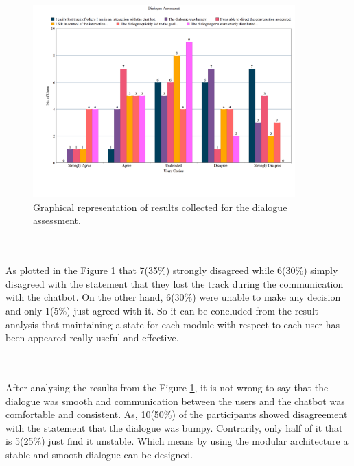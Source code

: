 \begin{figure}[!h]
    \centering
    \includegraphics[width=0.9\textwidth]{img/Dialogue_Assessment_Updated.png}
    \caption{Graphical representation of results collected for the dialogue assessment.}
    \label{fig:dialogAssess}
\end{figure}
\\~\\
As plotted in the Figure \ref{fig:dialogAssess} that 7(35\%) strongly disagreed while 6(30\%) simply disagreed with the statement that they lost the track during the communication with the chatbot. On the other hand, 6(30\%) were unable to make any decision and only 1(5\%) just agreed with it. So it can be concluded from the result analysis that maintaining a state for each module with respect to each user has been appeared really useful and effective.

\\~\\
After analysing the results from the Figure \ref{fig:dialogAssess}, it is not wrong to say that the dialogue was smooth and communication between the users and the chatbot was comfortable and consistent. As, 10(50\%) of the participants showed disagreement with the statement that the dialogue was bumpy. Contrarily, only half of it that is 5(25\%) just find it unstable. Which means by using the modular architecture a stable and smooth dialogue can be designed.

